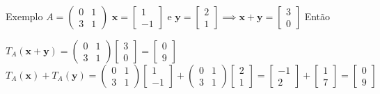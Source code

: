 \documentclass{beamer}
\begin{document}
\begin{frame}{Exemplo}
  $A=\begin{pmatrix}
    0 & 1 \\ 3 & 1
    \end{pmatrix}$ $\mathbf{x}=\begin{bmatrix}
      1 \\ -1
    \end{bmatrix} \text{ e } \mathbf{y} = \begin{bmatrix}
      2 \\ 1
    \end{bmatrix} \implies \mathbf{x}+ \mathbf{y}=\begin{bmatrix}
      3 \\ 0
    \end{bmatrix}$ Então

  $T_A(\mathbf{x}+\mathbf{y}) = \begin{pmatrix}
    0 & 1 \\ 3 & 1
    \end{pmatrix}\begin{bmatrix}
      3 \\ 0
    \end{bmatrix} = \begin{bmatrix}
      0 \\ 9
    \end{bmatrix}$
$T_A(\mathbf{x}) + T_A(\mathbf{y}) = \begin{pmatrix}
  0 & 1 \\ 3 & 1
  \end{pmatrix}\begin{bmatrix}
    1 \\ -1
  \end{bmatrix} + \begin{pmatrix}
    0 & 1 \\ 3 & 1
    \end{pmatrix}\begin{bmatrix}
      2 \\ 1
    \end{bmatrix}= \begin{bmatrix}
      -1 \\ 2 
    \end{bmatrix} + \begin{bmatrix}
      1 \\ 7
    \end{bmatrix} = \begin{bmatrix}
      0 \\ 9
    \end{bmatrix}$

\end{frame}
\end{document}
